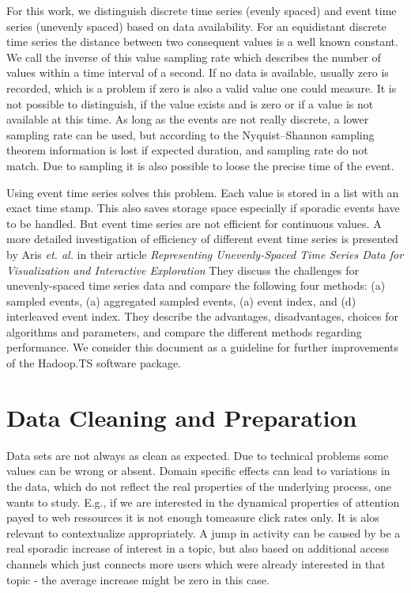 \documentclass[a4paper,10pt]{scrbook}
\begin{document}
For this work, we distinguish discrete time series (evenly spaced) and event time series (unevenly spaced) based on data availability. For an equidistant discrete time series the distance between two consequent values is a well known constant. We call the inverse of this value sampling rate which describes the number of values within a time interval of a second. If no data is available, usually zero is recorded, which is a problem if zero is also a valid value one could measure. It is not possible to distinguish, if the value exists and is zero or if a value is not available at this time. As long as the events are not really discrete, a lower sampling rate can be used, but according to the Nyquist–Shannon sampling theorem information is lost if expected duration, and sampling rate do not match. Due to sampling it is also possible to loose the precise time of the event. 

Using event time series solves this problem. Each value is stored in a list with an exact time stamp. This also saves storage space especially if sporadic events have to be handled. But event time series are not efficient for continuous values. A more detailed investigation of efficiency of different event time series is presented by Aris \textit{et. al.} in their article \textit{Representing Unevenly-Spaced Time Series Data for Visualization and Interactive Exploration} \cite{Aris2005} %
They discuss the challenges for unevenly-spaced time series data and compare the following four methods: (a) sampled events, (a) aggregated sampled events, (a) event index, and (d) interleaved event index. They describe the advantages, disadvantages,
choices for algorithms and parameters, and compare the different methods regarding performance. We consider this document as a guideline for further improvements of the Hadoop.TS software package.

\section{Data Cleaning and Preparation}
\label{DCLP}
Data sets are not always as clean as expected. Due to technical problems some values can be wrong or absent. Domain specific effects can lead to variations in the data, which do not reflect the real properties of the underlying process, one wants to study. E.g., if we are interested in the dynamical properties of attention payed to web ressources it is not enough tomeasure click rates only. It is alos relevant to contextualize appropriately. A jump in activity can be caused by be a real sporadic increase of interest in a topic, but also based on additional access channels which just connects more users which were already interested in that topic - the average increase might be zero in this case. 
\end{document}
